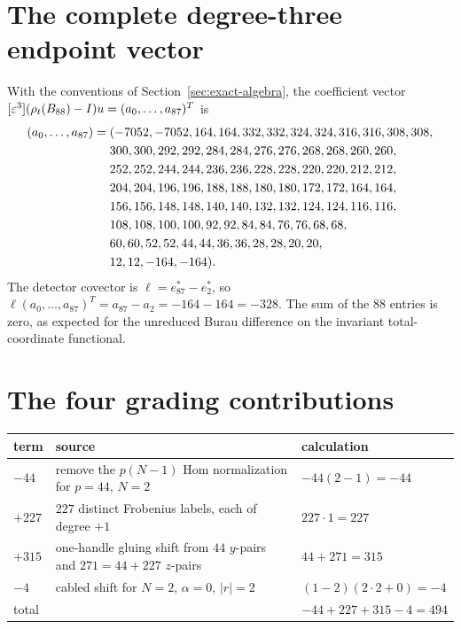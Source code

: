 \section{The complete degree-three endpoint vector}\label{app:vector}

With the conventions of Section~\ref{sec:exact-algebra}, the coefficient
vector $[\varepsilon^3](\rho_t(B_{88})-I)u=(a_0,\ldots,a_{87})^T$ is
\begin{align}
(a_0,\ldots,a_{87})={}&(
-7052,-7052,164,164,332,332,324,324,316,316,308,308,\notag\\
&300,300,292,292,284,284,276,276,268,268,260,260,\notag\\
&252,252,244,244,236,236,228,228,220,220,212,212,\notag\\
&204,204,196,196,188,188,180,180,172,172,164,164,\notag\\
&156,156,148,148,140,140,132,132,124,124,116,116,\notag\\
&108,108,100,100,92,92,84,84,76,76,68,68,\notag\\
&60,60,52,52,44,44,36,36,28,28,20,20,\notag\\
&12,12,-164,-164).
\end{align}
The detector covector is $\ell=e_{87}^*-e_2^*$, so
$\ell(a_0,\ldots,a_{87})^T=a_{87}-a_2=-164-164=-328$.
The sum of the $88$ entries is zero, as expected for the unreduced Burau
difference on the invariant total-coordinate functional.

\section{The four grading contributions}\label{app:grading}

\begin{center}
\begin{tabular}{@{}p{}p{}p{}@{}}
\toprule
term & source & calculation\\
\midrule
$-44$ & remove the $p(N-1)$ Hom normalization for $p=44$, $N=2$ & $-44(2-1)=-44$\\
$+227$ & $227$ distinct Frobenius labels, each of degree $+1$ & $227\cdot1=227$\\
$+315$ & one-handle gluing shift from $44$ $y$-pairs and $271=44+227$ $z$-pairs & $44+271=315$\\
$-4$ & cabled shift for $N=2$, $\alpha=0$, $|r|=2$ & $(1-2)(2\cdot2+0)=-4$\\
\midrule
total & & $-44+227+315-4=494$\\
\bottomrule
\end{tabular}
\end{center}

